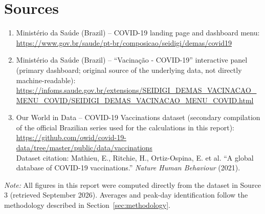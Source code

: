 \documentclass[11pt]{article}
\begin{document}
\section{Sources}
\label{sec:sources}

\begin{enumerate}[leftmargin=1.5em]
    \footnotesize
    \item Minist\'erio da Sa\'ude (Brazil) -- COVID-19 landing page and dashboard menu: \\
    \url{https://www.gov.br/saude/pt-br/composicao/seidigi/demas/covid19}
    \item Minist\'erio da Sa\'ude (Brazil) -- ``Vacina\c{c}\~ao - COVID-19'' interactive panel (primary
    dashboard; original source of the underlying data, not directly machine-readable): \\
    \url{https://infoms.saude.gov.br/extensions/SEIDIGI_DEMAS_VACINACAO_MENU_COVID/SEIDIGI_DEMAS_VACINACAO_MENU_COVID.html}
    \item Our World in Data -- COVID-19 Vaccinations dataset (secondary compilation of the official
    Brazilian series used for the calculations in this report): \\
    \url{https://github.com/owid/covid-19-data/tree/master/public/data/vaccinations} \\
    Dataset citation: Mathieu, E., Ritchie, H., Ortiz-Ospina, E. et al. ``A global database of
    COVID-19 vaccinations.'' \emph{Nature Human Behaviour} (2021).
\end{enumerate}

\vspace{1em}
{\footnotesize \textit{Note:} All figures in this report were computed directly from the dataset in
Source 3 (retrieved September 2026). Averages and peak-day identification follow the methodology
described in Section~\ref{sec:methodology}.}
\end{document}
